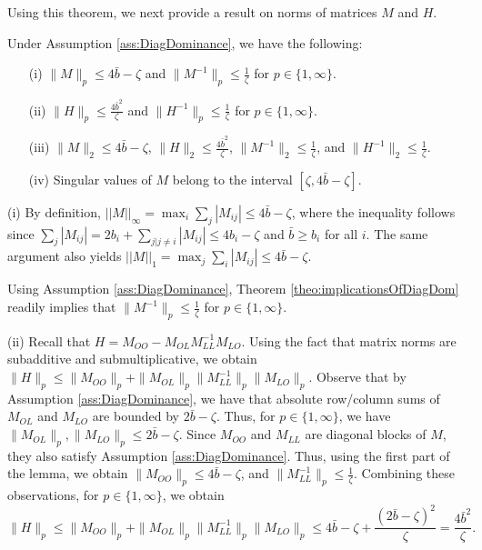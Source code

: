 \documentclass[opre,nonblindrev]{informs3} %
\begin{document}
\begin{APPENDIX}{}
 Using this theorem, we next provide a result on norms of matrices  $M$ and $H$.
 \begin{lemma} \label{lem:matBounds}
 	Under Assumption \ref{ass:DiagDominance}, we have the following:
 	\begin{itemize}
 		\item[(i)] $\| M \|_p \leq 4 \bar{b}-\zeta $ and $\| M^{-1} \|_p \leq \frac{1}{\zeta}$ for $p\in\{1,\infty\}$.
 		\item[(ii)] $\| H \|_p \leq \frac{4\bar b^2}{\zeta}$ and $\| H^{-1} \|_p \leq  \frac{1}{\zeta}$ for $p\in\{1,\infty\}$.
 		\item[(iii)] $\|M\|_2\leq 4 \bar{b}-\zeta$,  $\|H\|_2\leq \frac{4\bar b^2}{\zeta}$, $\|M^{-1}\|_2  \leq \frac{1}{\zeta}$, and $\|H^{-1}\|_2\leq \frac{1}{\zeta}$.
 		\item[(iv)] Singular values of $M$ belong to the interval $[\zeta, 4\bar{b}-\zeta]$.
 	\end{itemize}
 \end{lemma}
 (i) By definition,
 $||M||_\infty = \max_i \sum_{j} |M_{ij}|\leq 4\bar b-\zeta$, where the inequality follows since $\sum_{j} |M_{ij}|=2b_i + \sum_{j| j\neq i} |M_{ij}| \leq 4b_i-\zeta$ and $\bar{b}\geq b_i$ for all $i$.
 The same argument also yields $||M||_1 = \max_j \sum_{i} |M_{ij}|\leq 4 \bar{b}-\zeta$.
 
 Using Assumption \ref{ass:DiagDominance},
 Theorem \ref{theo:implicationsOfDiagDom} readily implies that $\| M^{-1} \|_p \leq \frac{1}{\zeta}$ for $p\in\{1,\infty\}$.
 
 (ii) Recall that
 $H=M_{OO}-M_{OL}M_{LL}^{-1}M_{LO}$.
 Using the fact that matrix norms are subadditive and submultiplicative, we obtain
 $\|H\|_p \leq \|M_{OO}\|_p + \|M_{OL}\|_p \|M_{LL}^{-1}\|_p  \|M_{LO}\|_p$.
 Observe that by Assumption \ref{ass:DiagDominance}, we have that absolute row/column sums of $M_{OL}$ and $M_{LO}$ are bounded by $2\bar b-\zeta$. Thus, for $p\in \{1,\infty \}$, we have $\|M_{OL}\|_p,\|M_{LO}\|_p\leq 2\bar b-\zeta$.
 Since $M_{OO}$ and $M_{LL}$ are diagonal blocks of $M$, they also satisfy Assumption \ref{ass:DiagDominance}. Thus, using the first part of the lemma, we obtain
 $\| M_{OO} \|_p \leq 4 \bar{b}-\zeta$, and $\| M_{LL}^{-1} \|_p \leq \frac{1}{\zeta}$.
 Combining these observations, for $p\in\{1,\infty \}$, we obtain
 \[
 \|H\|_p \leq \|M_{OO}\|_p + \|M_{OL}\|_p \|M_{LL}^{-1}\|_p  \|M_{LO}\|_p
 \leq 4 \bar{b}-\zeta  +   \frac{(2\bar b-\zeta)^2}{\zeta}=  \frac{4\bar b^2}{\zeta} .
 \]
 

\end{APPENDIX}
\end{document}
